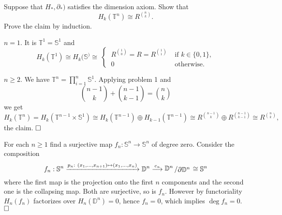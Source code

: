 \documentclass[11pt]{book}
\numberwithin{dummy}{section}
\theoremstyle{nonumberbreak}
\newenvironment{sol}[1][]{\ifthenelse{\equal{#1}{}}{\solution}{\solution[#1]}\rm}{\endsolution}
\newenvironment{prob}[1][]{\ifthenelse{\equal{#1}{}}{\problem}{\problem[#1]}\rm}{\endproblem}
\newcommand{\Sph}{\mathbb{S}}
\newcommand{\la}{\longrightarrow}
\newcommand{\slant}[2]{{\raisebox{.1em}{$#1$}\left/\raisebox{-.1em}{$#2$}\right.}}
\begin{document}
\begin{spacing}{1.4}
\begin{prob}   %
Suppose that $H_*, \partial_*)$ satisfies the dimension axiom. Show that 
$$H_k(\mathbb{T}^n) \cong R^{\binom{n}{k}}.$$
\begin{sol}
Prove the claim by induction.
\begin{compactenum}
\item[\textbf{$n=1.$}] It is $\mathbb{T}^1 = \mathbb{S}^1$ and
$$H_k(\mathbb{T}^1) \cong H_k(\Sph^) \cong \ \begin{cases} \ R^{\binom{1}{0}} = R = R^{\binom{1}{1}} & \textrm{ if } k \in \{0,1\}, \\ \ 0 & \textrm{ otherwise.} \end{cases}$$
\item[\textbf{$n\geqslant 2$}.] We have $\mathbb{T}^n = \prod_{i=1}^n \Sph^1$. Applying problem 1 and
$$\binom{n-1}{k} + \binom{n-1}{k-1} = \binom{n}{k}$$
 we get
 $$H_k(\mathbb{T}^n) = H_k(\mathbb{T}^{n-1} \times \Sph^1) \cong H_k(\mathbb{T}^{n-1}) \oplus H_{k-1}(\mathbb{T}^{n-1}) \cong R^{\binom{n-1}{k}} \oplus R^{\binom{n-1}{k-1}} \cong R^{\binom{n}{k}},$$
 the claim. $\hfill \Box$
\end{compactenum}
\end{sol}

\end{prob}


\begin{prob}    %
For each $n\geqslant1$ find a surjective map $f_n: \Sph^n \la \Sph^n$ of degree zero.
\begin{sol}
Consider the composition 
$$f_n: \mathbb{S}^n \xrightarrow{p_n: \ (x_1, \ldots, x_{n+1}) \mapsto (x_1,\ldots, x_n)} \mathbb{D}^n \overset{c_n}{\la} \slant{\mathbb{D}^n}{\partial \mathbb{D}^n} \cong \Sph^n$$
where the first map is the projection onto the first $n$ components and the second one is the collapsing map. Both are surjective, so is $f_n$. However by functoriality $H_n(f_n)$ factorizes over $H_n(\mathbb{D}^n) = 0$, hence $f_n=0$, which implies $\deg f_n=0$. $\hfill \Box$
\end{sol}
\end{prob}



\end{spacing}
\end{document}
